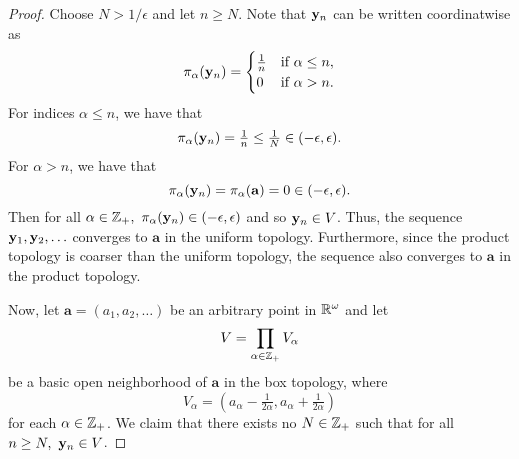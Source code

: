 \begin{solution}
\begin{proof}
        Choose $N > 1/\epsilon$ and let $n \geq N$.
        Note that $\mathbf{y}_n$ can be written coordinatwise as
        \begin{equation*}
            \pi_\alpha(\mathbf{y}_n) = \begin{cases}
                \tfrac{1}{n}    & \text{if } \alpha \leq n, \\
                0               & \text{if } \alpha > n.
            \end{cases}
        \end{equation*}
        For indices $\alpha \leq n$, we have that
        \begin{equation*}
            \pi_\alpha(\mathbf{y}_n) = \tfrac{1}{n} \leq \tfrac{1}{N} \in (-\epsilon, \epsilon).
        \end{equation*}
        For $\alpha > n$, we have that
        \begin{equation*}
            \pi_\alpha(\mathbf{y}_n) = \pi_\alpha(\mathbf{a}) = 0 \in (-\epsilon, \epsilon).
        \end{equation*}
        Then for all $\alpha \in \mathbb{Z}_+,~ \pi_\alpha(\mathbf{y}_n) \in (-\epsilon, \epsilon)$ and so $\mathbf{y}_n \in V$.
        Thus, the sequence $\mathbf{y}_1, \mathbf{y}_2, \ldots$ converges to $\mathbf{a}$ in the uniform topology.
        Furthermore, since the product topology is coarser than the uniform topology, the sequence also converges to $\mathbf{a}$ in the product topology.

        Now, let $\mathbf{a} = (a_1, a_2, \ldots)$ be an arbitrary point in $\mathbb{R}^\omega$ and let
        \begin{equation*}
            V = \prod_{\alpha\in\mathbb{Z}_+} V_\alpha
        \end{equation*}
        be a basic open neighborhood of $\mathbf{a}$ in the box topology, where 
        \begin{equation*}
            V_\alpha = (a_\alpha - \tfrac{1}{2\alpha}, a_\alpha + \tfrac{1}{2\alpha})
        \end{equation*}
        for each $\alpha \in \mathbb{Z}_+$.
        We claim that there exists no $N \in \mathbb{Z}_+$ such that for all $n \geq N,~ \mathbf{y}_n \in V$.


\end{proof}
\end{solution}
